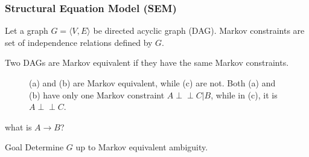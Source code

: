 \documentclass[10pt]{beamer}
\def\red{\color{red}}
\newcommand{\indep}{\perp \!\!\! \perp}
\begin{document}
\begin{frame}
\frametitle{Structural Equation Model (SEM)}

\begin{definition}
Let a graph $G=\langle V, E \rangle$ be directed acyclic graph (DAG). Markov constraints are set of independence relations defined by $G$.
\end{definition}
\begin{definition}
Two DAGs are Markov equivalent if they have the same Markov constraints.
\end{definition}

\begin{figure}
    \centering
    \begin{subfigure}{0.3\textwidth}
    \resizebox{0.8\textwidth}{!} {
    }
    \subcaption{ }
    \label{fig:markov_equiv_1}
    \end{subfigure}
    \begin{subfigure}{0.3\textwidth}
    \subcaption{ }
    \label{fig:markov_equiv_2}
    \end{subfigure}
    \begin{subfigure}{0.3\textwidth}
    \subcaption{ }
    \label{fig:markov_equiv_2}
    \end{subfigure}
    \caption{(a) and (b) are Markov equivalent, while (c) are not. Both (a) and (b) have only one Markov constraint $A \indep C | B$, while in (c), it is $A \indep C$.}
\end{figure}
{\red what is $A \rightarrow B$?}
\begin{block}{Goal}
    Determine $G$ up to Markov equivalent ambiguity.
\end{block}
\end{frame}
\end{document}
